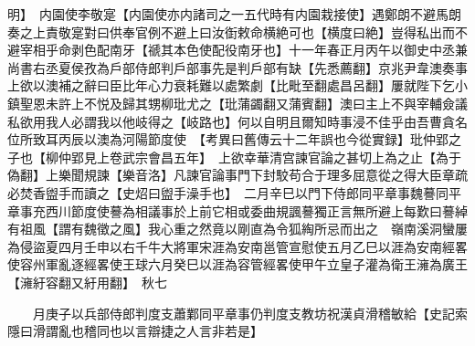 明】　内園使李敬寔【内園使亦内諸司之一五代時有内園栽接使】遇鄭朗不避馬朗奏之上責敬寔對曰供奉官例不避上曰汝衘敕命横絶可也【横度曰絶】豈得私出而不避宰相乎命剥色配南牙【禠其本色使配役南牙也】十一年春正月丙午以御史中丞兼尚書右丞夏侯孜為戶部侍郎判戶部事先是判戶部有缺【先悉薦翻】京兆尹韋澳奏事上欲以澳補之辭曰臣比年心力衰耗難以處繁劇【比毗至翻處昌呂翻】屢就陛下乞小鎮聖恩未許上不悦及歸其甥柳玭尤之【玭蒲蠲翻又蒲賓翻】澳曰主上不與宰輔僉議私欲用我人必謂我以他岐得之【岐路也】何以自明且爾知時事浸不佳乎由吾曹貪名位所致耳丙辰以澳為河陽節度使　【考異曰舊傳云十二年誤也今從實録】玭仲郢之子也【柳仲郢見上卷武宗會昌五年】　上欲幸華清宫諫官論之甚切上為之止【為于偽翻】上樂聞規諫【樂音洛】凡諫官論事門下封駮苟合于理多屈意從之得大臣章疏必焚香盥手而讀之【史炤曰盥手澡手也】　二月辛巳以門下侍郎同平章事魏謩同平章事充西川節度使謩為相議事於上前它相或委曲規諷謩獨正言無所避上每歎曰謩綽有祖風【謂有魏徵之風】我心重之然竟以剛直為令狐綯所忌而出之　嶺南溪洞蠻屢為侵盜夏四月壬申以右千牛大將軍宋涯為安南邕管宣慰使五月乙巳以涯為安南經畧使容州軍亂逐經畧使王球六月癸巳以涯為容管經畧使甲午立皇子灌為衛王澭為廣王【澭紆容翻又紆用翻】　秋七

　　月庚子以兵部侍郎判度支蕭鄴同平章事仍判度支教坊祝漢貞滑稽敏給【史記索隱曰滑謂亂也稽同也以言辯捷之人言非若是】

